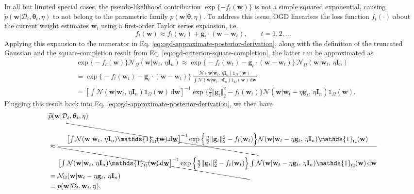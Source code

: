 In all but limited special cases, the pseudo-likelihood contribution $\exp\{-f_t(\mathbf{w})\}$ is not a simple squared exponential, causing $\widetilde{p}(\mathbf{w}|\mathcal{D}_t, \boldsymbol{\theta}_t, \eta)$ to not belong to the parametric family $p(\mathbf{w}|\boldsymbol{\theta}, \eta)$. To address this issue, OGD linearises the loss function $f_t(\cdot)$ about the current weight estimates $\mathbf{w}_t$ using a first-order Taylor series expansion, i.e.\
\begin{equation}
	f_t(\mathbf{w})
	\approx f_t(\mathbf{w}_t) + \mathbf{g}_t \cdot (\mathbf{w}-\mathbf{w}_t),
	\qquad t = 1, 2, \ldots
\end{equation}
Applying this expansion to the numerator in Eq. \eqref{eq:ogd-approximate-posterior-derivation}, along with the definition of the truncated Gaussian and the square-completion result from Eq. \eqref{eq:ogd-criterion-square-completion}, the latter can be approximated as
\begin{align}
	& \exp\Big\{-f_t(\mathbf{w})\Big\}\mathcal{N}_{\Omega}(\mathbf{w}|\mathbf{w}_t,\, \eta\mathbf{I}_n)
	\approx \exp\Big\{-f_t(\mathbf{w}_t) - \mathbf{g}_t \cdot (\mathbf{w}-\mathbf{w}_t)\Big\}\,\mathcal{N}_{\Omega}(\mathbf{w}|\mathbf{w}_t,\, \eta\mathbf{I}_n)
	\nonumber \\
	&= \exp\Big\{-f_t(\mathbf{w}_t) - \mathbf{g}_t \cdot (\mathbf{w}-\mathbf{w}_t)\Big\}\,
	\frac{\mathcal{N}(\mathbf{w}|\mathbf{w}_t,\, \eta\mathbf{I}_n)\mathds{1}_{\Omega}(\mathbf{w})}{\int \mathcal{N}(\mathbf{w}|\mathbf{w}_t,\, \eta\mathbf{I}_n)\mathds{1}_{\Omega}(\mathbf{w})\, \mathrm{d}\mathbf{w}}
	\nonumber \\
	&= \left[\int \mathcal{N}(\mathbf{w}|\mathbf{w}_t,\, \eta\mathbf{I}_n)\mathds{1}_{\Omega}(\mathbf{w}) \, \mathrm{d}\mathbf{w}\right]^{-1}
	\exp\Big\{\frac{\eta}{2}\Vert\mathbf{g}_t\Vert_2^2 - f_t(\mathbf{w}_t)\Big\}
	\mathcal{N}(\mathbf{w}|\mathbf{w}_t - \eta\mathbf{g}_t,\, \eta\mathbf{I}_n)\mathds{1}_{\Omega}(\mathbf{w}).
\end{align}
Plugging this result back into Eq. \eqref{eq:ogd-approximate-posterior-derivation}, we then have
\begin{align}
	& \widetilde{p}(\mathbf{w}|\mathcal{D}_t, \boldsymbol{\theta}_t, \eta)
	\nonumber \\
	&\approx \frac{\bcancel{\left[\int \mathcal{N}(\mathbf{w}|\mathbf{w}_t,\, \eta\mathbf{I}_n)\mathds{1}_{\Omega}(\mathbf{w}) \, \mathrm{d}\mathbf{w}\right]^{-1}
	\exp\Big\{\frac{\eta}{2}\Vert\mathbf{g}_t\Vert_2^2 - f_t(\mathbf{w}_t)\Big\}}
	\mathcal{N}(\mathbf{w}|\mathbf{w}_t - \eta\mathbf{g}_t,\, \eta\mathbf{I}_n)\mathds{1}_{\Omega}(\mathbf{w})}{\bcancel{\left[\int \mathcal{N}(\mathbf{w}|\mathbf{w}_t,\, \eta\mathbf{I}_n)\mathds{1}_{\Omega}(\mathbf{w}) \, \mathrm{d}\mathbf{w}\right]^{-1}
	\exp\Big\{\frac{\eta}{2}\Vert\mathbf{g}_t\Vert_2^2 - f_t(\mathbf{w}_t)\Big\}}
	\int \mathcal{N}(\mathbf{w}|\mathbf{w}_t - \eta\mathbf{g}_t,\, \eta\mathbf{I}_n)\mathds{1}_{\Omega}(\mathbf{w})\, \mathrm{d}\mathbf{w}}
	\nonumber \\
	&= \mathcal{N}_{\Omega}(\mathbf{w}|\mathbf{w}_t - \eta\mathbf{g}_t,\, \eta\mathbf{I}_n)
	\nonumber \\
	&= p(\mathbf{w}|\mathcal{D}_t, \mathbf{w}_t, \eta),
\end{align}
